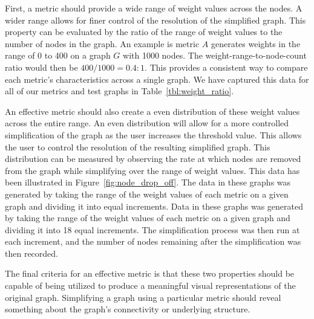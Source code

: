 First, a metric should provide a wide range of weight values across the nodes.  A wider range allows for finer control of the resolution of the simplified graph. This property can be evaluated by the ratio of the range of weight values to the number of nodes in the graph. An example is metric $A$ generates weights in the range of 0 to 400 on a graph $G$ with 1000 nodes.  The weight-range-to-node-count ratio would then be $400/1000 = 0.4:1$.  This provides a consistent way to compare each metric's characteristics across a single graph.  We have captured this data for all of our metrics and test graphs in Table~\ref{tbl:weight_ratio}.

An effective metric should also create a even distribution of these weight values across the entire range.  An even distribution will allow for a more controlled simplification of the graph as the user increases the threshold value.  This allows the user to control the resolution of the resulting
simplified graph.  This distribution can be measured by observing the rate at which nodes are removed from the graph while simplifying over the range of weight values.  This data has been illustrated in Figure~\ref{fig:node_drop_off}.  The data in these graphs was generated by taking the range of the weight values of each metric on a given graph and dividing it into equal increments.  Data in these graphs was generated by taking the range of the weight values of each metric on a given graph and dividing it into 18 equal increments.  The simplification process was then run at each increment, and the number of nodes remaining after the simplification was then recorded.

The final criteria for an effective metric is that these two properties should be capable of being utilized to produce a meaningful visual representations of the original graph.  Simplifying a graph using a particular metric should reveal something about the graph's connectivity or underlying structure.

